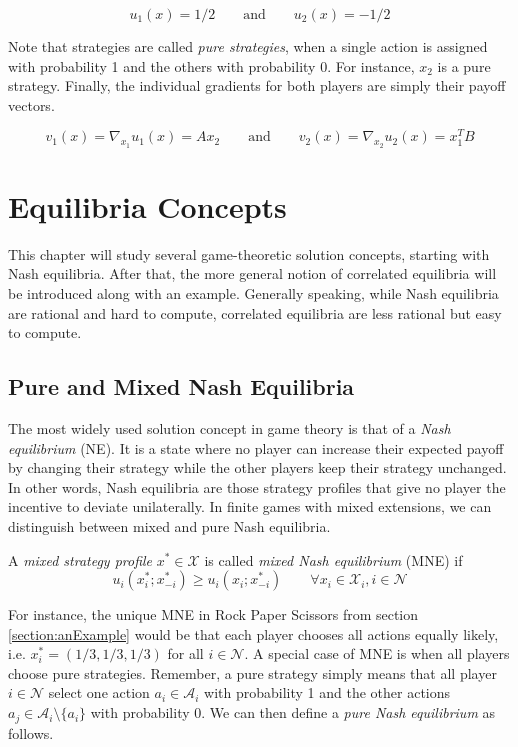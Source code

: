 \begin{equation*}
    u_1(x) = 1/2  \qquad \text{and} \qquad u_2(x) = -1/2
\end{equation*}

Note that strategies are called \textit{pure strategies}, when a single action is assigned with probability 1 and the others with probability 0. For instance, $x_2$ is a pure strategy. Finally, the individual gradients for both players are simply their payoff vectors.

\begin{equation*}
    v_1(x) = \nabla_{x_1}u_1(x) = Ax_2 \qquad \text{and} \qquad v_2(x) = \nabla_{x_2}u_2(x) = x_{1}^{T}B
\end{equation*}


\section{Equilibria Concepts}\label{section:equilibriaConcepts}

This chapter will study several game-theoretic solution concepts, starting with Nash equilibria. After that, the more general notion of correlated equilibria will be introduced along with an example. Generally speaking, while Nash equilibria are rational and hard to compute, correlated equilibria are less rational but easy to compute.

\subsection{Pure and Mixed Nash Equilibria}\label{subsection:PNEandMNE}

The most widely used solution concept in game theory is that of a \textit{Nash equilibrium} (NE). It is a state where no player can increase their expected payoff by changing their strategy while the other players keep their strategy unchanged. In other words, Nash equilibria are those strategy profiles that give no player the incentive to deviate unilaterally. In finite games with mixed extensions, we can distinguish between mixed and pure Nash equilibria. 

\begin{definition}\label{def:MNE}
A \textit{mixed strategy profile} $x^* \in \mathcal{X}$ is called \textit{mixed Nash equilibrium} (MNE) if
    \[u_i(x_{i}^{*};x_{-i}^{*}) \ge  u_i(x_{i};x_{-i}^{*}) \qquad \forall x_i \in \mathcal{X}_i, i \in \mathcal{N}\]
\end{definition}

For instance, the unique MNE in Rock Paper Scissors from section \ref{section:anExample} would be that each player chooses all actions equally likely, i.e. $x_{i}^{*} = (1/3,1/3,1/3)$ for all $i \in \mathcal{N}$. A special case of MNE is when all players choose pure strategies. Remember, a pure strategy simply means that all player $i \in \mathcal{N}$ select one action $a_i \in \mathcal{A}_i$ with probability 1 and the other actions $a_j \in \mathcal{A}_i \setminus \{a_i\}$ with probability 0. We can then define a \textit{pure Nash equilibrium} as follows.

